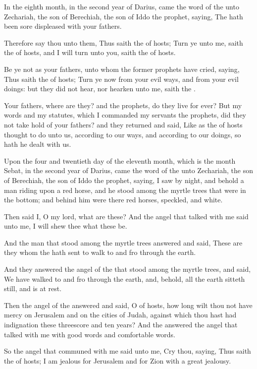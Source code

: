 \Chapter
\Verse In the eighth month, in the second year of Darius, came the word of the \LORD unto Zechariah, the son of Berechiah, the son of Iddo the prophet, saying, \Verse The \LORD hath been sore displeased with your fathers.

\Verse Therefore say thou unto them, Thus saith the \LORD of hosts; Turn ye unto me, saith the \LORD of hosts, and I will turn unto you, saith the \LORD of hosts.

\Verse Be ye not as your fathers, unto whom the former prophets have cried, saying, Thus saith the \LORD of hosts; Turn ye now from your evil ways, and from your evil doings: but they did not hear, nor hearken unto me, saith the \LORD.

\Verse Your fathers, where are they? and the prophets, do they live for ever?  \Verse But my words and my statutes, which I commanded my servants the prophets, did they not take hold of your fathers? and they returned and said, Like as the \LORD of hosts thought to do unto us, according to our ways, and according to our doings, so hath he dealt with us.

\Verse Upon the four and twentieth day of the eleventh month, which is the month Sebat, in the second year of Darius, came the word of the \LORD unto Zechariah, the son of Berechiah, the son of Iddo the prophet, saying, \Verse I saw by night, and behold a man riding upon a red horse, and he stood among the myrtle trees that were in the bottom; and behind him were there red horses, speckled, and white.

\Verse Then said I, O my lord, what are these? And the angel that talked with me said unto me, I will shew thee what these be.

\Verse And the man that stood among the myrtle trees answered and said, These are they whom the \LORD hath sent to walk to and fro through the earth.

\Verse And they answered the angel of the \LORD that stood among the myrtle trees, and said, We have walked to and fro through the earth, and, behold, all the earth sitteth still, and is at rest.

\Verse Then the angel of the \LORD answered and said, O \LORD of hosts, how long wilt thou not have mercy on Jerusalem and on the cities of Judah, against which thou hast had indignation these threescore and ten years?  \Verse And the \LORD answered the angel that talked with me with good words and comfortable words.

\Verse So the angel that communed with me said unto me, Cry thou, saying, Thus saith the \LORD of hosts; I am jealous for Jerusalem and for Zion with a great jealousy.

